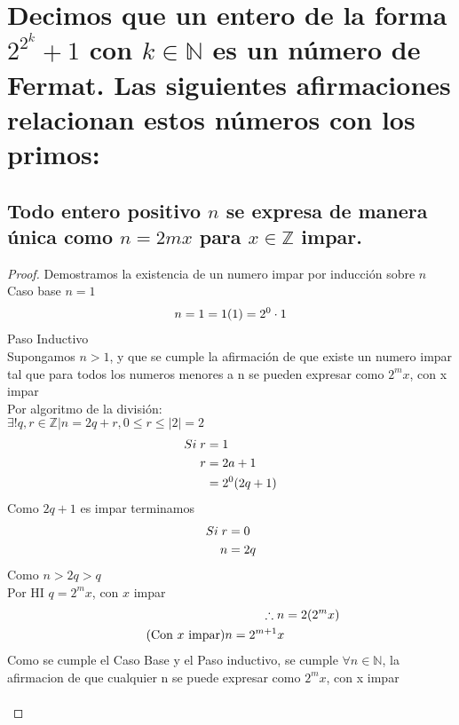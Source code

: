\section{Decimos que un entero de la forma $2^2^k + 1$ con $k \in \mathbb{N}$ es un número de Fermat. Las siguientes afirmaciones relacionan estos números con los primos:}
     \subsection{Todo entero positivo $n$ se expresa de manera única como $n = 2mx$ para $x \in \mathbb{Z}$ impar.}
    \begin{proof}
        Demostramos la existencia de un numero impar por inducción sobre $n$ \\
        Caso base $n = 1$\\
        \begin{align}
            \notag n = 1 = 1(1) = 2^0 \cdot 1
        \end{align}
        Paso Inductivo \\
        Supongamos $n > 1$, y que se cumple la afirmación  de que existe un numero impar tal que para todos los numeros menores a n se pueden expresar como $2^mx$, con x impar \\
        Por algoritmo de la división: \\
        $\exists ! q,r \in \mathbb{Z} | n = 2q+r, 0 \leq r \leq |2| = 2$
        \begin{align}
            \notag Si \; r &= 1\\
            \notag r &= 2a+1 \\
            \notag &= 2^0(2q+1)
        \end{align}
        Como $2q+1$ es impar terminamos
         \begin{align}
            \notag Si \; r &= 0\\
            \notag n &= 2q
        \end{align}
        Como $n>2q>q$ \\
        Por HI $q=2^mx$, con $x$ impar \\
        \begin{align}
            \notag \therefore n &= 2(2^mx) \\
            \tag{Con $x$ impar} n = 2^{m+1}x
        \end{align}
        Como se cumple el Caso Base y el Paso inductivo, se cumple $\forall n \in \mathbb{N}$, la afirmacion de que cualquier n se puede expresar como $2^mx$, con x impar \\ \\

\end{proof}
